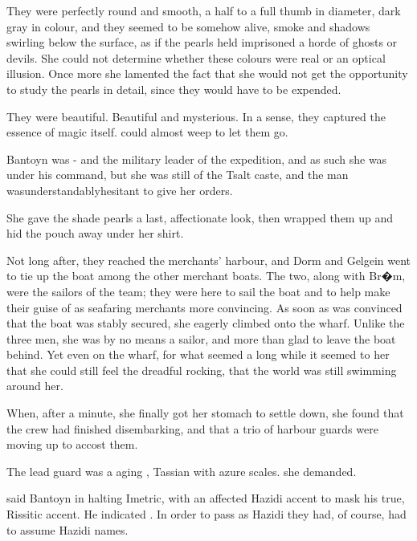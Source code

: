 They were perfectly round and smooth, a half to a full thumb in diameter, dark gray in colour, and they seemed to be somehow alive, smoke and shadows swirling below the surface, as if the pearls held imprisoned a horde of ghosts or devils. She could not determine whether these colours were real or an optical illusion. Once more she lamented the fact that she would not get the opportunity to study the pearls in detail, since they would have to be expended. 

They were beautiful. Beautiful and mysterious. In a sense, they captured the essence of magic itself. \Filgzed{} could almost weep to let them go. 

 Bantoyn was \Rekkan{}-\Ondmyst{} and the military leader of the expedition, and as such she was under his command, but she was still of the Tsalt caste, and the man was\dash{}understandably\dash{}hesitant to give her orders. 


 She gave the shade pearls a last, affectionate look, then wrapped them up and hid the pouch away under her shirt. 

Not long after, they reached the merchants' harbour, and Dorm and Gelgein went to tie up the boat among the other merchant boats. The two, along with Br�m, were the sailors of the team; they were here to sail the boat and to help make their guise of as seafaring merchants more convincing. 
As soon as \Filgzed{} was convinced that the boat was stably secured, she eagerly climbed onto the wharf. Unlike the three men, she was by no means a sailor, and more than glad to leave the boat behind. Yet even on the wharf, for what seemed a long while it seemed to her that she could still feel the dreadful rocking, that the world was still swimming around her. 

When, after a minute, she finally got her stomach to settle down, she found that the crew had finished disembarking, and that a trio of harbour guards were moving up to accost them.

The lead guard was a aging \sphyle, Tassian with azure scales.  she demanded. 

 said Bantoyn in halting Imetric, with an affected Hazidi accent to mask his true, Rissitic accent. He indicated \Filgzed{}.  In order to pass as Hazidi they had, of course, had to assume Hazidi names. 

